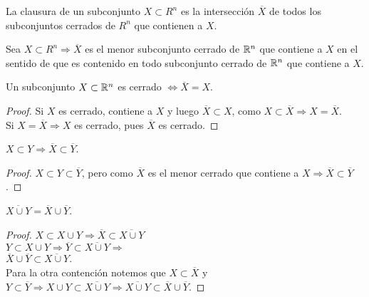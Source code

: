 \begin{definition}[Clausura]
  La clausura de un subconjunto \(X \subset R^n\) es la intersección \(\overline{X}\) de todos los subconjuntos cerrados de \(R^n\) que contienen a \(X\).
\end{definition}

\begin{prop}
  Sea \(X \subset R^n \Rightarrow \overline{X}\) es el menor subconjunto cerrado de \(\mathbb{R}^n\) que contiene a \(X\) en el sentido de que es contenido en todo subconjunto cerrado de \(\mathbb{R}^n\) que contiene a \(X\).
\end{prop}

\begin{corollary}
  Un subconjunto \(X \subset \mathbb{R}^n\) es cerrado \(\iff \overline{X} = X\).
  \begin{proof}
    Si \(X\) es cerrado, contiene a \(X\) y luego \(\overline{X} \subset X\), como \(X \subset \overline{X} \Rightarrow X = \overline{X}\). \\
    Si \(X = \overline{X} \Rightarrow X\) es cerrado, pues \(\overline{X}\) es cerrado.
  \end{proof}
\end{corollary}

\begin{prop}
  \(X \subset Y \Rightarrow \overline{X} \subset \overline{Y}\).
  \begin{proof}
    \(X \subset Y \subset \overline{Y}\), pero como \(\overline{X}\) es el menor cerrado que contiene a \(X \Rightarrow \overline{X} \subset \overline{Y}\).
  \end{proof}
\end{prop}

\begin{prop}
  \(\overline{X \cup Y} = \overline{X} \cup \overline{Y}\).
  \begin{proof}
    \(X \subset X \cup Y \Rightarrow \overline{X} \subset \overline{X \cup Y}\) \\
    \(Y \subset X \cup Y \Rightarrow \overline{Y} \subset \overline{X \cup Y} \Rightarrow\) \\
    \(\overline{X} \cup \overline{Y} \subset \overline{X \cup Y}\). \\
    Para la otra contención notemos que \(X \subset \overline{X}\) y \(Y \subset \overline{Y} \Rightarrow X \cup Y \subset \overline{X \cup Y} \Rightarrow \overline{X \cup Y} \subset \overline{X} \cup \overline{Y}\).
  \end{proof}
\end{prop}

